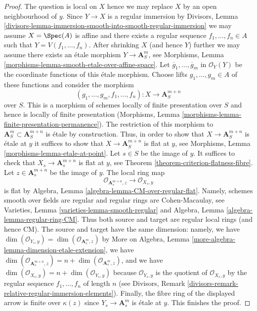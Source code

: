 \begin{proof}
The question is local on $X$ hence we may replace $X$ by
an open neighbourhood of $y$. Since $Y \to X$ is a regular immersion
by Divisors, Lemma
\ref{divisors-lemma-immersion-smooth-into-smooth-regular-immersion}
we may assume $X = \Spec(A)$ is affine and there exists a regular sequence
$f_1, \ldots, f_n \in A$ such that $Y = V(f_1, \ldots, f_n)$.
After shrinking $X$ (and hence $Y$) further
we may assume there exists an \'etale morphism $Y \to \mathbf{A}^m_S$, see
Morphisms, Lemma \ref{morphisms-lemma-smooth-etale-over-affine-space}.
Let $\overline{g}_1, \ldots, \overline{g}_m$ in $\mathcal{O}_Y(Y)$
be the coordinate functions of this \'etale morphism.
Choose lifts $g_1, \ldots, g_m \in A$ of these functions
and consider the morphism
$$
(g_1, \ldots, g_m, f_1, \ldots, f_n) :
X
\longrightarrow
\mathbf{A}^{m + n}_S
$$
over $S$. This is a morphism of schemes locally of finite presentation
over $S$ and hence is locally of finite presentation
(Morphisms, Lemma \ref{morphisms-lemma-finite-presentation-permanence}).
The restriction of this morphism to
$\mathbf{A}^m_S \subset \mathbf{A}^{m + n}_S$
is \'etale by construction. Thus, in order to show that
$X \to \mathbf{A}^{m + n}_S$ is \'etale at $y$
it suffices to show that $X \to \mathbf{A}^{m + n}_S$ is flat at $y$,
see Morphisms, Lemma \ref{morphisms-lemma-etale-at-point}.
Let $s \in S$ be the image of $y$. It suffices to check that
$X_s \to \mathbf{A}^{m + n}_s$ is flat at $y$, see
Theorem \ref{theorem-criterion-flatness-fibre}.
Let $z \in \mathbf{A}^{m + n}_s$ be the image of $y$.
The local ring map
$$
\mathcal{O}_{\mathbf{A}^{m + n}_s, z}
\longrightarrow
\mathcal{O}_{X_s, y}
$$
is flat by Algebra, Lemma \ref{algebra-lemma-CM-over-regular-flat}.
Namely, schemes smooth over fields are regular and regular rings
are Cohen-Macaulay, see Varieties, Lemma \ref{varieties-lemma-smooth-regular}
and Algebra, Lemma \ref{algebra-lemma-regular-ring-CM}.
Thus both source and target are regular local rings (and hence CM).
The source and target have the same dimension: namely, we have
$\dim(\mathcal{O}_{Y_s, y}) = \dim(\mathcal{O}_{\mathbf{A}^m_s, z})$
by More on Algebra, Lemma \ref{more-algebra-lemma-dimension-etale-extension},
we have $\dim(\mathcal{O}_{\mathbf{A}^{m + n}_s, z}) = n +
\dim(\mathcal{O}_{\mathbf{A}^m_s, z})$, and we have
$\dim(\mathcal{O}_{X_s, y}) = n + \dim(\mathcal{O}_{Y_s, y})$
because $\mathcal{O}_{Y_s, y}$ is the quotient of
$\mathcal{O}_{X_s, y}$ by the regular sequence $f_1, \ldots, f_n$
of length $n$ (see
Divisors, Remark \ref{divisors-remark-relative-regular-immersion-elements}).
Finally, the fibre ring of the displayed arrow is finite over $\kappa(z)$
since $Y_s \to \mathbf{A}^m_s$ is \'etale at $y$.
This finishes the proof.
\end{proof}

